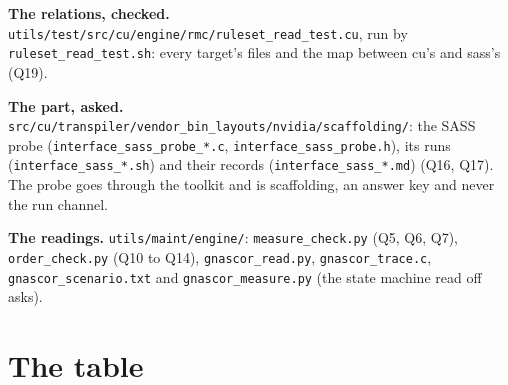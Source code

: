 \textbf{The relations, checked.} \texttt{utils/\allowbreak{}test/\allowbreak{}src/\allowbreak{}cu/\allowbreak{}engine/\allowbreak{}rmc/\allowbreak{}ruleset\_\allowbreak{}read\_\allowbreak{}test.\allowbreak{}cu}, run by \texttt{ruleset\_\allowbreak{}read\_\allowbreak{}test.\allowbreak{}sh}: every target's files and the map between cu's and sass's (Q19).

\textbf{The part, asked.} \texttt{src/\allowbreak{}cu/\allowbreak{}transpiler/\allowbreak{}vendor\_\allowbreak{}bin\_\allowbreak{}layouts/\allowbreak{}nvidia/\allowbreak{}scaffolding/\allowbreak{}}: the SASS probe (\texttt{interface\_\allowbreak{}sass\_\allowbreak{}probe\_\allowbreak{}*.\allowbreak{}c}, \texttt{interface\_\allowbreak{}sass\_\allowbreak{}probe.\allowbreak{}h}), its runs (\texttt{interface\_\allowbreak{}sass\_\allowbreak{}*.\allowbreak{}sh}) and their records (\texttt{interface\_\allowbreak{}sass\_\allowbreak{}*.\allowbreak{}md}) (Q16, Q17). The probe goes through the toolkit and is scaffolding, an answer key and never the run channel.

\textbf{The readings.} \texttt{utils/\allowbreak{}maint/\allowbreak{}engine/\allowbreak{}}: \texttt{measure\_\allowbreak{}check.\allowbreak{}py} (Q5, Q6, Q7), \texttt{order\_\allowbreak{}check.\allowbreak{}py} (Q10 to Q14), \texttt{gnascor\_\allowbreak{}read.\allowbreak{}py}, \texttt{gnascor\_\allowbreak{}trace.\allowbreak{}c}, \texttt{gnascor\_\allowbreak{}scenario.\allowbreak{}txt} and \texttt{gnascor\_\allowbreak{}measure.\allowbreak{}py} (the state machine read off asks).

\section{\texorpdfstring{The table}{The table}}

